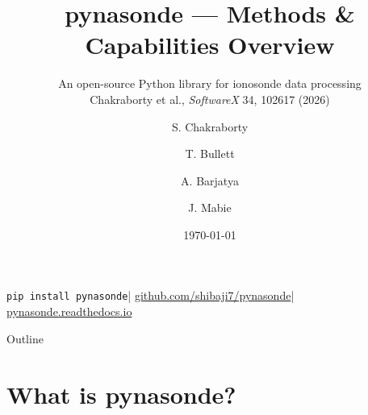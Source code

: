 \documentclass[aspectratio=169,11pt]{beamer}
\title[pynasonde — Methods \& Capabilities]{%
  \textbf{pynasonde} — Methods \& Capabilities Overview}
\subtitle{An open-source Python library for ionosonde data processing\\
  \small\normalfont Chakraborty et al., \textit{SoftwareX} 34, 102617 (2026)}
\author{S. Chakraborty \and T. Bullett \and A. Barjatya \and J. Mabie}
\institute{Embry-Riddle Aeronautical University \;|\; Fourth State Communications}
\date{\today}
\begin{document}

\begin{frame}
  \titlepage
  \vspace{-0.6cm}
  \begin{center}
    \small
    \texttt{pip install pynasonde}\quad|\quad
    \href{https://github.com/shibaji7/pynasonde}{github.com/shibaji7/pynasonde}\quad|\quad
    \href{https://pynasonde.readthedocs.io}{pynasonde.readthedocs.io}
  \end{center}
\end{frame}

\begin{frame}{Outline}
  \tableofcontents
\end{frame}

\section{What is pynasonde?}
\end{document}
